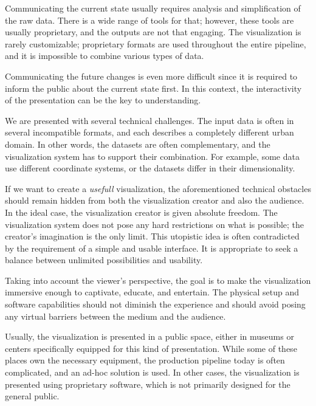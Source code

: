 Communicating the current state usually requires analysis and simplification of the raw data. There is a wide range of tools for that; however, these tools are usually proprietary, and the outputs are not that engaging. The visualization is rarely customizable; proprietary formats are used throughout the entire pipeline, and it is impossible to combine various types of data.

Communicating the future changes is even more difficult since it is required to inform the public about the current state first. In this context, the interactivity of the presentation can be the key to understanding.

We are presented with several technical challenges. The input data is often in several incompatible formats, and each describes a completely different urban domain. In other words, the datasets are often complementary, and the visualization system has to support their combination. For example, some data use different coordinate systems, or the datasets differ in their dimensionality.

If we want to create a \textit{usefull} visualization, the aforementioned technical obstacles should remain hidden from both the visualization creator and also the audience. In the ideal case, the visualization creator is given absolute freedom. The visualization system does not pose any hard restrictions on what is possible; the creator's imagination is the only limit. This utopistic idea is often contradicted by the requirement of a simple and usable interface. It is appropriate to seek a balance between unlimited possibilities and usability.

Taking into account the viewer's perspective, the goal is to make the visualization immersive enough to captivate, educate, and entertain. The physical setup and software capabilities should not diminish the experience and should avoid posing any virtual barriers between the medium and the audience.

Usually, the visualization is presented in a public space, either in museums or centers specifically equipped for this kind of presentation. While some of these places own the necessary equipment, the production pipeline today is often complicated, and an ad-hoc solution is used. In other cases, the visualization is presented using proprietary software, which is not primarily designed for the general public.

